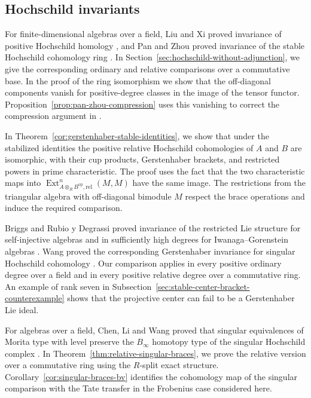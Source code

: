 \documentclass[12pt,a4paper,english,reqno]{amsart}
\numberwithin{equation}{section}
\theoremstyle{plain}
\theoremstyle{definition}
\begin{document}
\subsection{Hochschild invariants}

For finite-dimensional algebras over a field, Liu and Xi proved
invariance of positive Hochschild homology
\cite[Theorem~4.4]{LiuXi2005}, and Pan and Zhou proved invariance of the
stable Hochschild cohomology ring \cite[Theorem~1.2]{PanZhou2010}.
In Section~\ref{sec:hochschild-without-adjunction}, we give the
corresponding ordinary and relative comparisons over a commutative
base. In the proof of the ring isomorphism we show that the
off-diagonal components vanish for positive-degree classes in the
image of the tensor functor. Proposition~\ref{prop:pan-zhou-compression}
uses this vanishing to correct the compression argument in
\cite[Theorem~1.2]{PanZhou2010}.

In Theorem~\ref{cor:gerstenhaber-stable-identities}, we show that
under the stabilized identities the positive relative Hochschild
cohomologies of $A$ and $B$ are isomorphic, with their cup products,
Gerstenhaber brackets, and restricted powers in prime characteristic.
The proof uses the fact that the two characteristic maps into
$\operatorname{Ext}^n_{A\otimes_R B^{\mathrm{op}},\mathrm{rel}}(M,M)$
have the same image. The restrictions from the triangular algebra
with off-diagonal bimodule $M$ respect the brace operations and
induce the required comparison.

Briggs and Rubio y Degrassi proved invariance of the restricted Lie
structure for self-injective algebras and in sufficiently high
degrees for Iwanaga--Gorenstein algebras \cite{BriggsRubio2022}.
Wang proved the corresponding Gerstenhaber invariance for singular
Hochschild cohomology \cite[Theorem~6.2]{Wang2021Gerstenhaber}.
Our comparison applies in every positive ordinary degree over a
field and in every positive relative degree over a commutative ring.
An example of rank seven in
Subsection~\ref{sec:stable-center-bracket-counterexample} shows that
the projective center can fail to be a Gerstenhaber Lie ideal.

For algebras over a field, Chen, Li and Wang proved that singular
equivalences of Morita type with level preserve the $B_\infty$
homotopy type of the singular Hochschild complex
\cite[Theorem~9.6 and Proposition~9.7]{ChenLiWangBInfinity}.
In Theorem~\ref{thm:relative-singular-braces}, we prove the relative
version over a commutative ring using the $R$-split exact structure.
Corollary~\ref{cor:singular-braces-bv} identifies the cohomology map
of the singular comparison with the Tate transfer in the Frobenius
case considered here.
\end{document}
